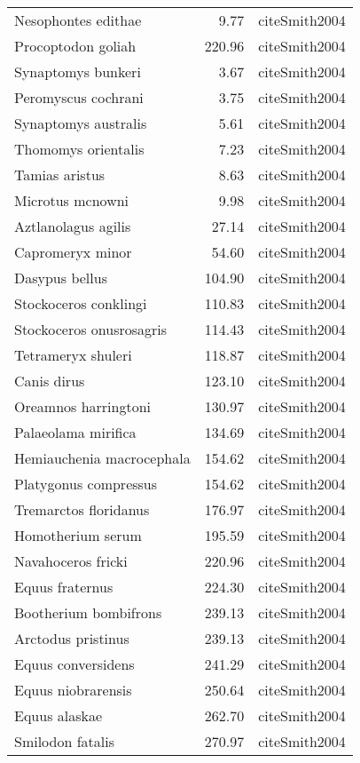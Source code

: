 \begin{table}[ht]
\begin{tabular}{lrl}
  Nesophontes edithae & 9.77 & cite{Smith2004} \\ 
  Procoptodon goliah & 220.96 & cite{Smith2004} \\ 
  Synaptomys bunkeri & 3.67 & cite{Smith2004} \\ 
  Peromyscus cochrani & 3.75 & cite{Smith2004} \\ 
  Synaptomys australis & 5.61 & cite{Smith2004} \\ 
  Thomomys orientalis & 7.23 & cite{Smith2004} \\ 
  Tamias aristus & 8.63 & cite{Smith2004} \\ 
  Microtus mcnowni & 9.98 & cite{Smith2004} \\ 
  Aztlanolagus agilis & 27.14 & cite{Smith2004} \\ 
  Capromeryx minor & 54.60 & cite{Smith2004} \\ 
  Dasypus bellus & 104.90 & cite{Smith2004} \\ 
  Stockoceros conklingi & 110.83 & cite{Smith2004} \\ 
  Stockoceros onusrosagris & 114.43 & cite{Smith2004} \\ 
  Tetrameryx shuleri & 118.87 & cite{Smith2004} \\ 
  Canis dirus & 123.10 & cite{Smith2004} \\ 
  Oreamnos harringtoni & 130.97 & cite{Smith2004} \\ 
  Palaeolama mirifica & 134.69 & cite{Smith2004} \\ 
  Hemiauchenia macrocephala & 154.62 & cite{Smith2004} \\ 
  Platygonus compressus & 154.62 & cite{Smith2004} \\ 
  Tremarctos floridanus & 176.97 & cite{Smith2004} \\ 
  Homotherium serum & 195.59 & cite{Smith2004} \\ 
  Navahoceros fricki & 220.96 & cite{Smith2004} \\ 
  Equus fraternus & 224.30 & cite{Smith2004} \\ 
  Bootherium bombifrons & 239.13 & cite{Smith2004} \\ 
  Arctodus pristinus & 239.13 & cite{Smith2004} \\ 
  Equus conversidens & 241.29 & cite{Smith2004} \\ 
  Equus niobrarensis & 250.64 & cite{Smith2004} \\ 
  Equus alaskae & 262.70 & cite{Smith2004} \\ 
  Smilodon fatalis & 270.97 & cite{Smith2004} \\ 

\end{tabular}
\end{table}
